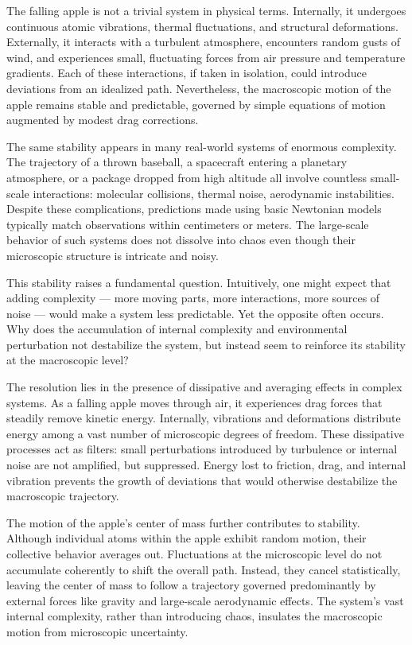 The falling apple is not a trivial system in physical terms. Internally, it undergoes continuous atomic vibrations, thermal fluctuations, and structural deformations. Externally, it interacts with a turbulent atmosphere, encounters random gusts of wind, and experiences small, fluctuating forces from air pressure and temperature gradients. Each of these interactions, if taken in isolation, could introduce deviations from an idealized path. Nevertheless, the macroscopic motion of the apple remains stable and predictable, governed by simple equations of motion augmented by modest drag corrections.

The same stability appears in many real-world systems of enormous complexity. The trajectory of a thrown baseball, a spacecraft entering a planetary atmosphere, or a package dropped from high altitude all involve countless small-scale interactions: molecular collisions, thermal noise, aerodynamic instabilities. Despite these complications, predictions made using basic Newtonian models typically match observations within centimeters or meters. The large-scale behavior of such systems does not dissolve into chaos even though their microscopic structure is intricate and noisy.

This stability raises a fundamental question. Intuitively, one might expect that adding complexity — more moving parts, more interactions, more sources of noise — would make a system less predictable. Yet the opposite often occurs. Why does the accumulation of internal complexity and environmental perturbation not destabilize the system, but instead seem to reinforce its stability at the macroscopic level?

The resolution lies in the presence of dissipative and averaging effects in complex systems. As a falling apple moves through air, it experiences drag forces that steadily remove kinetic energy. Internally, vibrations and deformations distribute energy among a vast number of microscopic degrees of freedom. These dissipative processes act as filters: small perturbations introduced by turbulence or internal noise are not amplified, but suppressed. Energy lost to friction, drag, and internal vibration prevents the growth of deviations that would otherwise destabilize the macroscopic trajectory.

The motion of the apple’s center of mass further contributes to stability. Although individual atoms within the apple exhibit random motion, their collective behavior averages out. Fluctuations at the microscopic level do not accumulate coherently to shift the overall path. Instead, they cancel statistically, leaving the center of mass to follow a trajectory governed predominantly by external forces like gravity and large-scale aerodynamic effects. The system's vast internal complexity, rather than introducing chaos, insulates the macroscopic motion from microscopic uncertainty.

